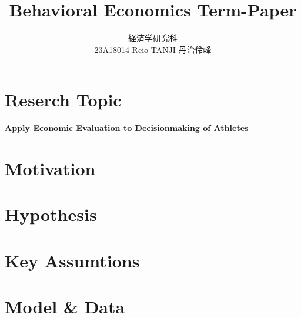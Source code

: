 \documentclass{jsarticle}[12pt]
\begin{document}
\title{Behavioral Economics Term-Paper}
\author{経済学研究科　 \\ 23A18014 Reio TANJI 丹治伶峰}
\date{}
\maketitle

\section{Reserch Topic}

\textbf{Apply Economic Evaluation to Decisionmaking of Athletes}



\section{Motivation}



\section{Hypothesis}



\section{Key Assumtions}



\section{Model \& Data}
\end{document}
